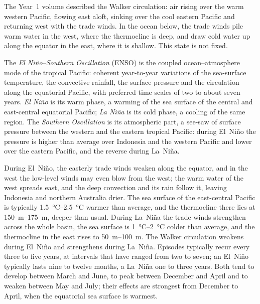 The Year~1 volume described the Walker circulation: air rising over the warm western Pacific,
flowing east aloft, sinking over the cool eastern Pacific and returning west with the trade
winds. In the ocean below, the trade winds pile warm water in the west, where the thermocline is
deep, and draw cold water up along the equator in the east, where it is shallow. This state is not
fixed.

\begin{definition}\label{def:b2:climate-variability:enso}
The \emph{El Niño--Southern Oscillation} (ENSO) is the
coupled ocean--atmosphere mode of the tropical Pacific: coherent year-to-year variations of the
sea-surface temperature, the convective rainfall, the surface pressure and the circulation along
the equatorial Pacific, with preferred time scales of two to about seven years. \emph{El
Niño} is its warm phase, a warming of the sea surface of the central and
east-central equatorial Pacific; \emph{La Niña} is its cold phase, a cooling of the
same region. The \emph{Southern Oscillation} is its atmospheric part,
a see-saw of surface pressure between the western and the eastern tropical Pacific: during El~Niño
the pressure is higher than average over Indonesia and the western Pacific and lower over the
eastern Pacific, and the reverse during La~Niña.
\end{definition}

During El~Niño, the easterly trade winds weaken along the equator, and in the west the
low-level winds may even blow from the west; the warm water of the west spreads east, and the deep
convection and its rain follow it, leaving Indonesia and northern Australia drier. The sea surface
of the east-central Pacific is typically \qtyrange{1.5}{2.5}{\celsius} warmer than average, and
the thermocline there lies at \qtyrange{150}{175}{m}, deeper than usual. During La~Niña the trade
winds strengthen across the whole basin, the sea surface is \qtyrange{1}{2}{\celsius} colder than
average, and the thermocline in the east rises to \qtyrange{50}{100}{m}. The Walker circulation
weakens during El~Niño and strengthens during La~Niña. Episodes typically recur every three to
five years, at intervals that have ranged from two to seven; an El~Niño typically lasts nine to
twelve months, a La~Niña one to three years. Both tend to develop between March and June, to
peak between December and April and to weaken between May and July; their effects are strongest
from December to April, when the equatorial sea surface is warmest.

